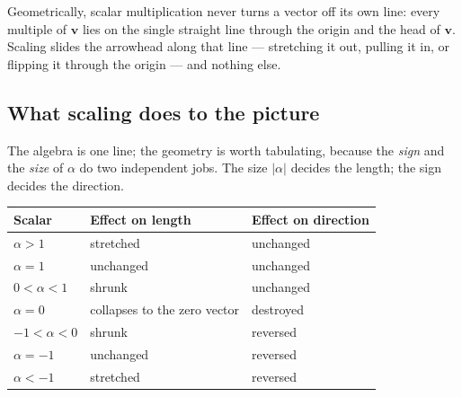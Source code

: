 \documentclass[11pt]{article}
\theoremstyle{definition}
\theoremstyle{remark}
\newcommand{\vc}[1]{\mathbf{#1}}
\newcommand{\lattice}[4]{%
  \draw[step=1cm,gray!25,very thin] (#1,#3) grid (#2,#4);
  \draw[axisline] (#1,0) -- (#2+0.45,0) node[right,font=\scriptsize,black]{$x$};
  \draw[axisline] (0,#3) -- (0,#4+0.45) node[above,font=\scriptsize,black]{$y$};
}
\begin{document}
\noindent Geometrically, scalar multiplication never turns a vector off its own
line: every multiple of $\vc{v}$ lies on the single straight line through the
origin and the head of $\vc{v}$. Scaling slides the arrowhead along that line
--- stretching it out, pulling it in, or flipping it through the origin --- and
nothing else.

\begin{center}
\end{center}

\subsection{What scaling does to the picture}
The algebra is one line; the geometry is worth tabulating, because the
\emph{sign} and the \emph{size} of $\alpha$ do two independent jobs. The size
$\lvert\alpha\rvert$ decides the length; the sign decides the direction.

\begin{center}
\renewcommand{\arraystretch}{1.25}
\begin{tabular}{@{}l l l@{}}
\toprule
\textbf{Scalar} & \textbf{Effect on length} & \textbf{Effect on direction} \\
\midrule
$\alpha>1$          & stretched                        & unchanged \\
$\alpha=1$          & unchanged                        & unchanged \\
$0<\alpha<1$        & shrunk                           & unchanged \\
$\alpha=0$          & collapses to the zero vector     & destroyed \\
$-1<\alpha<0$       & shrunk                           & reversed \\
$\alpha=-1$         & unchanged                        & reversed \\
$\alpha<-1$         & stretched                        & reversed \\
\bottomrule
\end{tabular}
\end{center}
\end{document}
